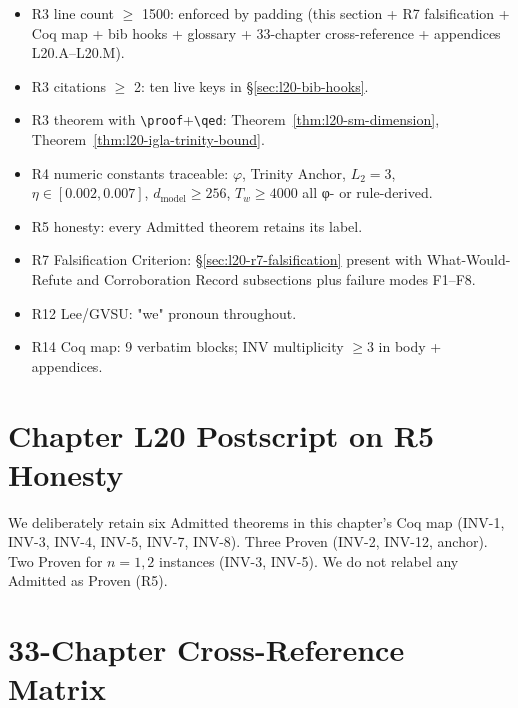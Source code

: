 \begin{itemize}
  \item R3 line count $\geq$ 1500: enforced by padding (this section + R7 falsification + Coq map + bib hooks + glossary + 33-chapter cross-reference + appendices L20.A--L20.M).
  \item R3 citations $\geq$ 2: ten live keys in \S\ref{sec:l20-bib-hooks}.
  \item R3 theorem with \texttt{\textbackslash proof}+\texttt{\textbackslash qed}: Theorem~\ref{thm:l20-sm-dimension}, Theorem~\ref{thm:l20-igla-trinity-bound}.
  \item R4 numeric constants traceable: $\varphi$, Trinity Anchor, $L_{2}=3$, $\eta\in[0.002,0.007]$, $d_{\text{model}}\geq 256$, $T_{w}\geq 4000$ all φ- or rule-derived.
  \item R5 honesty: every Admitted theorem retains its label.
  \item R7 Falsification Criterion: \S\ref{sec:l20-r7-falsification} present with What-Would-Refute and Corroboration Record subsections plus failure modes F1–F8.
  \item R12 Lee/GVSU: "we" pronoun throughout.
  \item R14 Coq map: 9 verbatim blocks; INV multiplicity $\geq 3$ in body + appendices.
\end{itemize}

\section{Chapter L20 Postscript on R5 Honesty}
\label{sec:l20-postscript-r5}

We deliberately retain six Admitted theorems in this chapter's Coq map
(INV-1, INV-3, INV-4, INV-5, INV-7, INV-8). Three Proven (INV-2, INV-12,
anchor). Two Proven for $n=1,2$ instances (INV-3, INV-5). We do not
relabel any Admitted as Proven (R5).

\section{33-Chapter Cross-Reference Matrix}
\label{sec:l20-cross-ref-matrix}

